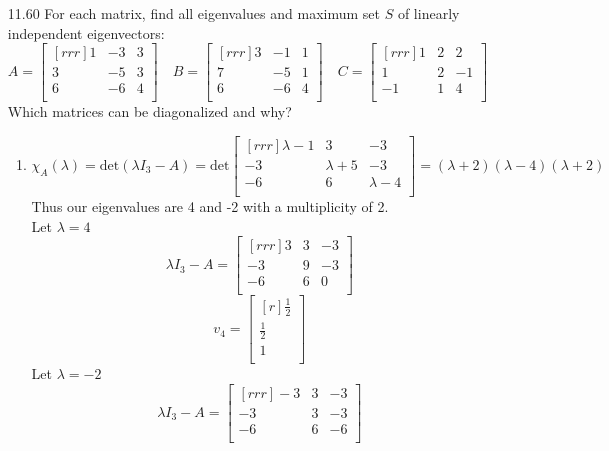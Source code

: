 \documentclass[12pt]{article}
\theoremstyle{definition}
\theoremstyle{plain}
\begin{document}
\begin{enumerate}
\begin{enumerate}
	\end{enumerate}
	
\item[11.60]For each matrix, find all eigenvalues and maximum set $S$ of linearly independent eigenvectors:
	\[ A=\begin{bmatrix}[rrr]1&-3&3\\3&-5&3\\6&-6&4\\\end{bmatrix} \quad B=\begin{bmatrix}[rrr]3&-1&1\\7&-5&1\\6&-6&4\\\end{bmatrix} \quad  C=\begin{bmatrix}[rrr]1&2&2\\1&2&-1\\-1&1&4\\\end{bmatrix} \]
	Which matrices can be diagonalized and why?
	\begin{enumerate}
	\item $\chi_A (\lambda) = \mathrm{det}(\lambda I_3 - A) = \mathrm{det}\begin{bmatrix}[rrr]\lambda-1&3&-3\\-3&\lambda+5 & -3\\-6&6&\lambda - 4\\\end{bmatrix} = (\lambda+2)(\lambda-4)(\lambda+2)$\\
	Thus our eigenvalues are 4 and -2 with a multiplicity of 2.\\
	Let $\lambda=4$
	\[ \lambda I_3-A = \begin{bmatrix}[rrr]3&3&-3\\-3&9&-3\\-6&6&0\\\end{bmatrix} \]
	\[ v_4 = \begin{bmatrix}[r]\frac{1}{2}\\\frac{1}{2}\\1\\\end{bmatrix} \]
	Let $\lambda=-2$	
	\[ \lambda I_3 - A = \begin{bmatrix}[rrr]-3&3&-3\\-3&3&-3\\-6&6&-6\\\end{bmatrix} \]

\end{enumerate}
\end{enumerate}
\end{document}
